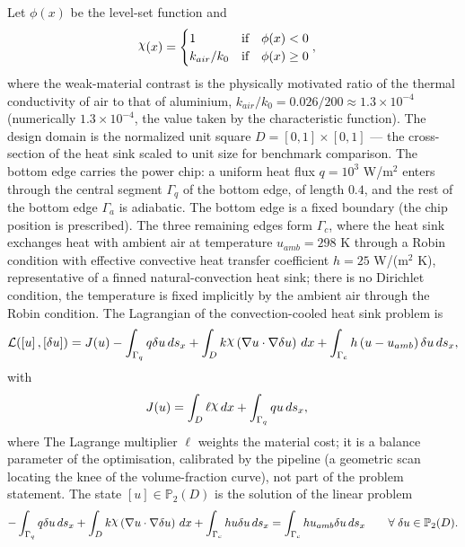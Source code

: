 \documentclass[preview]{standalone}
\let\oldcdot\cdot
\let\cdot\oldcdot
\begin{document}
Let $\phi(x)$ be the level-set function and
 \begin{align*}\raisebox{\depth}{$\chi$}(x) &= \begin{cases} 1 & \mbox{if}\quad \phi(x) < 0 \\ k_{air}/k_0 & \mbox{if}\quad \phi(x)  \ge 0 \end{cases},\end{align*}
where the weak-material contrast is the physically motivated ratio of the thermal conductivity of air to that of aluminium, $k_{air}/k_0 = 0.026/200 \approx 1.3 \times 10^{-4}$ (numerically $1.3 \times 10^{-4}$, the value taken by the characteristic function).
The design domain is the normalized unit square $D = [0,1] \times [0,1]$ — the cross-section of the heat sink scaled to unit size for benchmark comparison.  The bottom edge carries the power chip: a uniform heat flux $q = 10^{3}$ W/m$^{2}$ enters through the central segment $\Gamma_q$ of the bottom edge, of length $0.4$, and the rest of the bottom edge $\Gamma_a$ is adiabatic.  The bottom edge is a fixed boundary (the chip position is prescribed).  The three remaining edges form $\Gamma_c$, where the heat sink exchanges heat with ambient air at temperature $u_{amb} = 298$ K through a Robin condition with effective convective heat transfer coefficient $h = 25$ W/(m$^{2}$ K), representative of a finned natural-convection heat sink; there is no Dirichlet condition, the temperature is fixed implicitly by the ambient air through the Robin condition.
The Lagrangian of the convection-cooled heat sink problem is
\begin{dmath*}
\mathcal L(\left[ u\right],\left[ \delta u\right]) = J(u) -  \int_{\Gamma_q} q \delta u \,ds_x +  \int_{D} k \raisebox{\depth}{$\chi$} \left(  \nabla u  \cdot  \nabla \delta u  \right) \,dx + \int_{\Gamma_c} h \left( u - u_{amb}\right) \delta u \,ds_x ,
\end{dmath*}
with
\begin{align*}
J(u) &=  \int_{D} \ell \raisebox{\depth}{$\chi$} \,dx + \int_{\Gamma_q} q u \,ds_x,
 \end{align*}
where The Lagrange multiplier $\ell$ weights the material cost; it is a balance parameter of the optimisation, calibrated by the pipeline (a geometric scan locating the knee of the volume-fraction curve), not part of the problem statement.
The state $\left[ u\right] \in \mathbb P_{2}(D)$ is the solution of the linear problem
\begin{dmath*}
-  \int_{\Gamma_q} q \delta u \,ds_x +  \int_{D} k \raisebox{\depth}{$\chi$} \left(  \nabla u  \cdot  \nabla \delta u  \right) \,dx + \int_{\Gamma_c} h u \delta u \,ds_x = \int_{\Gamma_c} h u_{amb} \delta u \,ds_x \qquad \forall\; {\delta u\in \mathbb P_{2}(D)} .
\end{dmath*}
\end{document}
